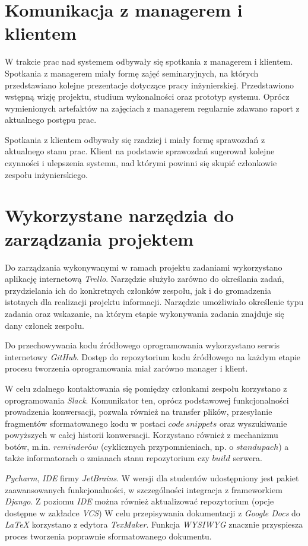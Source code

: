 \documentclass[pdflatex,11pt]{../aghdoc_version2}
\newlength\tindent
\renewcommand{\indent}{\hspace*{\tindent}}
\begin{document}
\section{Komunikacja z managerem i klientem}
W trakcie prac nad systemem odbywały się spotkania z managerem i klientem. Spotkania z
managerem miały formę zajęć seminaryjnych, na których przedstawiano kolejne prezentacje
dotyczące pracy inżynierskiej. Przedstawiono wstępną wizję projektu, studium wykonalności
oraz prototyp systemu. Oprócz wymienionych artefaktów na zajęciach z managerem
regularnie zdawano raport z aktualnego postępu prac.

Spotkania z klientem odbywały się rzadziej i miały formę sprawozdań z aktualnego stanu
prac. Klient na podstawie sprawozdań sugerował kolejne czynności i ulepszenia systemu,
nad którymi powinni się skupić członkowie zespołu inżynierskiego.

\section{Wykorzystane narzędzia do zarządzania projektem}
Do zarządzania wykonywanymi w ramach projektu zadaniami wykorzystano aplikację
internetową \textit{Trello}. Narzędzie służyło zarówno do określania zadań, przydzielania ich do
konkretnych członków zespołu, jak i do gromadzenia istotnych dla realizacji projektu
informacji. Narzędzie umożliwiało określenie typu zadania oraz wskazanie, na którym etapie
wykonywania zadania znajduje się dany członek zespołu.

\indent Do przechowywania kodu źródłowego oprogramowania wykorzystano serwis internetowy
\textit{GitHub}. Dostęp do repozytorium kodu źródłowego na każdym etapie procesu tworzenia
oprogramowania miał zarówno manager i klient. 

\indent W celu zdalnego kontaktowania się pomiędzy członkami zespołu korzystano z
oprogramowania \textit{Slack}. Komunikator ten, oprócz podstawowej funkcjonalności prowadzenia
konwersacji, pozwala również na transfer plików, przesyłanie fragmentów sformatowanego
kodu w postaci $code \ snippets$ oraz wyszukiwanie powyższych w całej historii konwersacji.
Korzystano również z mechanizmu botów, m.in. $reminderów$ (cyklicznych przypomnieniach,
np. o $standupach$) a także informatorach o zmianach stanu repozytorium czy $build$ serwera.

\indent \textit{Pycharm}, \textit{IDE} firmy \textit{JetBrains}. W wersji dla studentów udostępniony jest pakiet
zaawansowanych funkcjonalności, w szczególności integracja z frameworkiem \textit{Django}. Z
poziomu \textit{IDE} można również aktualizować repozytorium (opcje dostępne w zakładce \textit{VCS})
W celu przepisywania dokumentacji z \textit{Google Docs} do \textit{LaTeX} korzystano z edytora
\textit{TexMaker}. Funkcja \textit{WYSIWYG} znacznie przyspiesza proces tworzenia poprawnie
sformatowanego dokumentu.
\end{document}
